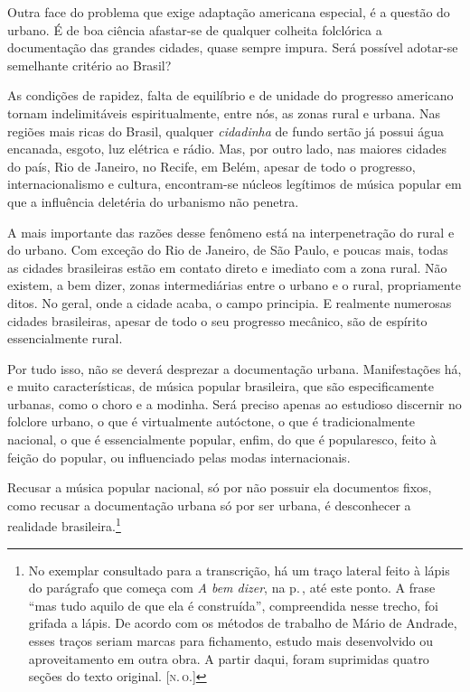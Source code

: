 Outra face do problema que exige adaptação americana especial, é a
questão do urbano. É de boa ciência afastar-se de qualquer colheita
folclórica a documentação das grandes cidades, quase sempre impura. Será
possível adotar-se semelhante critério ao Brasil?

As condições de rapidez, falta de equilíbrio e de unidade do progresso
americano tornam indelimitáveis espiritualmente, entre nós, as zonas
rural e urbana. Nas regiões mais ricas do Brasil, qualquer \textit{cidadinha} de
fundo sertão já possui água encanada, esgoto, luz elétrica e rádio. Mas,
por outro lado, nas maiores cidades do país, Rio de Janeiro, no Recife,
em Belém, apesar de todo o progresso, internacionalismo e cultura,
encontram-se núcleos legítimos de música popular em que a influência
deletéria do urbanismo não penetra.

A mais importante das razões desse fenômeno está na interpenetração do
rural e do urbano. Com exceção do Rio de Janeiro, de São Paulo, e poucas
mais, todas as cidades brasileiras estão em contato direto e imediato
com a zona rural. Não existem, a bem dizer, zonas intermediárias entre o
urbano e o rural, propriamente ditos. No geral, onde a cidade acaba, o
campo principia. E realmente numerosas cidades brasileiras, apesar de
todo o seu progresso mecânico, são de espírito essencialmente rural.

Por tudo isso, não se deverá desprezar a documentação urbana.
Manifestações há, e muito características, de música popular brasileira,
que são especificamente urbanas, como o choro e a modinha. Será preciso
apenas ao estudioso discernir no folclore urbano, o que é virtualmente
autóctone, o que é tradicionalmente nacional, o que é essencialmente
popular, enfim, do que é popularesco, feito à feição do popular, ou
influenciado pelas modas internacionais.

Recusar a música popular nacional, só por não possuir ela documentos
fixos, como recusar a documentação urbana só por ser urbana, é
desconhecer a realidade brasileira.\footnote{No exemplar consultado para a transcrição, há um traço lateral feito à lápis do parágrafo que começa com \textit{A bem dizer}, na p.\,\pageref{dizer}, até este ponto. A frase ``mas tudo aquilo de que ela é construída'', compreendida nesse trecho, foi grifada a lápis. De acordo com os métodos de trabalho de Mário de Andrade, esses traços seriam marcas para fichamento, estudo mais desenvolvido ou
aproveitamento em outra obra. A partir daqui, foram suprimidas quatro seções do texto original. \textsc{{[}n.\,o.{]}}}

